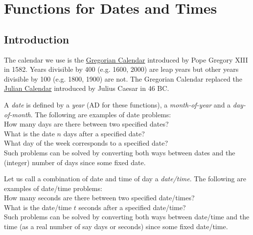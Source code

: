       \section{Functions for Dates and Times}

      \subsection{
        \label{Introduction}Introduction
      }
The calendar we use is the 
      \href{http://scienceworld.wolfram.com/astronomy/GregorianCalendar.html}{ Gregorian Calendar} introduced by Pope Gregory XIII in 1582.
      Years divisible by 400 (e.g. 1600, 2000) are leap years but other
      years divisible by 100 (e.g. 1800, 1900) are not. The Gregorian
      Calendar replaced the 
      \href{http://scienceworld.wolfram.com/astronomy/JulianCalendar.html}{ Julian Calendar} introduced by Julius Caesar in 46 BC.
      

A 
      \emph{date} is defined by a 
      \emph{year} (AD for these functions), a 
      \emph{month-of-year} and a 
      \emph{day-of-month}. The following are examples of date
      problems:
      \\How many days are there between two specified dates?
      \\What is the date 
      $n$ days after a specified date?
      \\What day of the week corresponds to a specified date?
      \\Such problems can be solved by converting both ways between
      dates and the (integer) number of days since some fixed date.
      

Let us call a combination of date and time of day a 
      \emph{date/time}. The following are examples of date/time
      problems:
      \\How many seconds are there between two specified
      date/times?
      \\What is the date/time 
      $t$ seconds after a specified date/time?
      \\Such problems can be solved by converting both ways between
      date/time and the time (as a real number of say days or seconds)
      since some fixed date/time.
      

